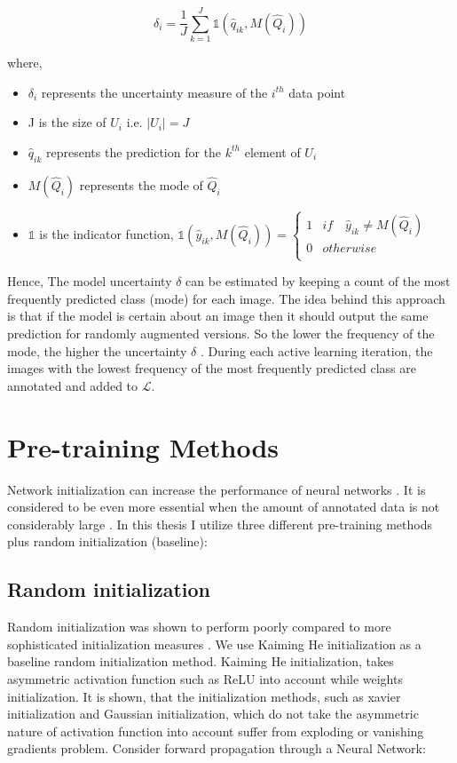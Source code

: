 \begin{equation}
    \label{equation:augmentation_based_sampling}
    \delta_{i} = \frac{1}{J} \sum_{k=1}^{J} \mathbb{1}(\hat{q}_{ik}, M(\hat{Q}_i))
\end{equation}

where,
\begin{itemize}[label={}]
  \setlength\itemsep{0em}
  \item $\delta_{i}$ represents the uncertainty measure of the $i^{th}$ data point
  \item J is the size of $U_i$ i.e. $|U_i| = J$
  \item $\hat{q}_{ik}$ represents the prediction for the $k^{th}$ element of $U_i$
  \item $M(\hat{Q}_i)$ represents the mode of $\hat{Q}_i$
  \item $\mathbb{1}$ is the indicator function, $\mathbb{1}(\hat{y}_{ik}, M(\hat{Q}_i)) = \begin{cases} 
      1 & if \quad \hat{y}_{ik} \neq M(\hat{Q}_i) \\
      0 & otherwise \\
   \end{cases}$
\end{itemize}

Hence, The model uncertainty $\delta$ can be estimated by keeping a count of the most frequently predicted class (mode) for each image. The idea behind this approach is that if the model is certain about an image then it should output the same prediction for randomly augmented versions. So the lower the frequency of the mode, the higher the uncertainty $\delta$ \cite{sadafi2019}. During each active learning iteration, the images with  the lowest frequency of the most frequently predicted class are annotated and added to $\mathcal{L}$.

\section{Pre-training Methods}\label{section:pretraining_methods}
Network initialization can increase the performance of neural networks \cite{hanin2018}. It is considered to be even more essential when the amount of annotated data is not considerably large \cite{holmberg2020}. In this thesis I utilize three different pre-training methods plus random initialization (baseline):

\subsection{Random initialization}
Random initialization was shown to perform poorly compared to more sophisticated initialization measures \cite{glorot2010}. We use Kaiming He initialization \cite{he2015} as a baseline random initialization method. Kaiming He initialization, takes asymmetric activation function such as ReLU into account while weights initialization. It is shown\cite{he2015}, that the initialization methods, such as xavier initialization\cite{glorot2010} and Gaussian initialization, which do not take the asymmetric nature of activation function into account suffer from exploding or vanishing gradients problem. Consider forward propagation through a Neural Network:

